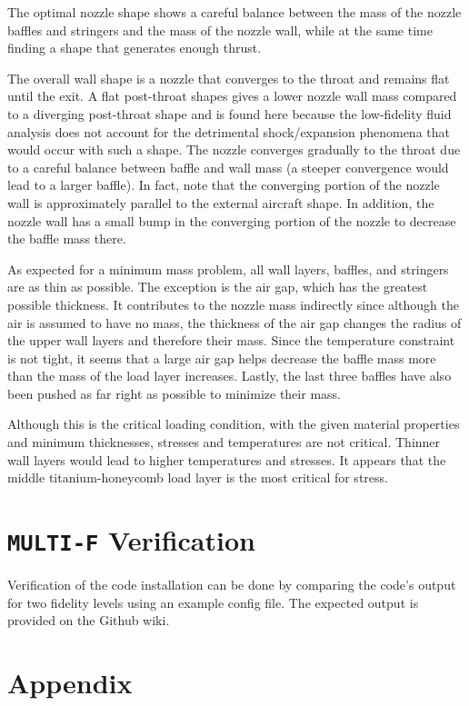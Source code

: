 \documentclass{article}
\begin{document}
The optimal nozzle shape shows a careful balance between the mass of the nozzle baffles and stringers and the mass of the nozzle wall, while at the same time finding a shape that generates enough thrust.

The overall wall shape is a nozzle that converges to the throat and remains flat until the exit. A flat post-throat shapes gives a lower nozzle wall mass compared to a diverging post-throat shape and is found here because the low-fidelity fluid analysis does not account for the detrimental shock/expansion phenomena that would occur with such a shape. The nozzle converges gradually to the throat due to a careful balance between baffle and wall mass (a steeper convergence would lead to a larger baffle). In fact, note that the converging portion of the nozzle wall is approximately parallel to the external aircraft shape. In addition, the nozzle wall has a small bump in the converging portion of the nozzle to decrease the baffle mass there.

As expected for a minimum mass problem, all wall layers, baffles, and stringers are as thin as possible. The exception is the air gap, which has the greatest possible thickness. It contributes to the nozzle mass indirectly since although the air is assumed to have no mass, the thickness of the air gap changes the radius of the upper wall layers and therefore their mass. Since the temperature constraint is not tight, it seems that a large air gap helps decrease the baffle mass more than the mass of the load layer increases. Lastly, the last three baffles have also been pushed as far right as possible to minimize their mass.

Although this is the critical loading condition, with the given material properties and minimum thicknesses, stresses and temperatures are not critical. Thinner wall layers would lead to higher temperatures and stresses. It appears that the middle titanium-honeycomb load layer is the most critical for stress.

\section{\texttt{MULTI-F} Verification} \label{sec:verification}

Verification of the code installation can be done by comparing the code's output for two fidelity levels using an example config file. The expected output is provided on the Github wiki.

\section{Appendix} \label{sec:appendix}
\end{document}
